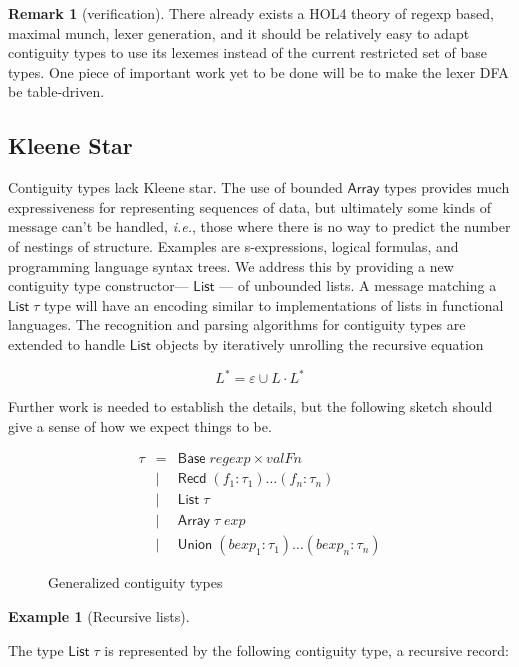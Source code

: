 \documentclass{article}
\newcommand{\ie}{\textit{i.e.}}
\newcommand{\konst}[1]{\ensuremath{\mathsf{#1}}}
\newcommand{\kstar}[1]{\ensuremath{{#1}^{*}}}
\theoremstyle{definition}
\newtheorem*{example}{Example}
\newtheorem*{remark}{Remark}
\begin{document}
\begin{remark} [verification] There already exists a
  HOL4 theory of regexp based, maximal munch, lexer generation,
  and it should be relatively easy to adapt contiguity types to use
  its lexemes instead of the current restricted set of base types. One
  piece of important work yet to be done will be to make the lexer DFA
  be table-driven.
\end{remark}

\subsection{Kleene Star}
  Contiguity types lack Kleene star. The use of bounded \konst{Array}
  types provides much expressiveness for representing sequences of
  data, but ultimately some kinds of message can't be handled, \ie,
  those where there is no way to predict the number of nestings of
  structure. Examples are s-expressions, logical formulas, and
  programming language syntax trees. We address this by providing a
  new contiguity type constructor--- \konst{List} --- of unbounded
  lists. A message matching a $\konst{List}\;\tau$ type will have an
  encoding similar to implementations of lists in functional
  languages. The recognition and parsing algorithms for contiguity
  types are extended to handle \konst{List} objects by iteratively
  unrolling the recursive equation

\[ \kstar{L} = \varepsilon \cup L \cdot \kstar{L} \]

Further work is needed to establish the details, but the following
sketch should give a sense of how we expect things to be.

\begin{figure}
\[
\begin{array}{rcl}
 \tau & =    & \konst{Base}\; \mathit{regexp} \times \mathit{valFn} \\
      & \mid & \konst{Recd}\; (f_1 : \tau_1) \ldots (f_n : \tau_n) \\
      & \mid & \konst{List}\; \tau \\
      & \mid & \konst{Array}\; \tau \; \mathit{exp} \\
      & \mid & \konst{Union}\; (\mathit{bexp}_1 : \tau_1) \ldots (\mathit{bexp}_n : \tau_n)
\end{array}
\]
\caption{Generalized contiguity types}
\label{gen-contig-types}
\end{figure}

\begin{example}[Recursive lists]

\end{example}
The type $\konst{List}\;\tau$ is represented by the following
contiguity type, a recursive record:
\end{document}
